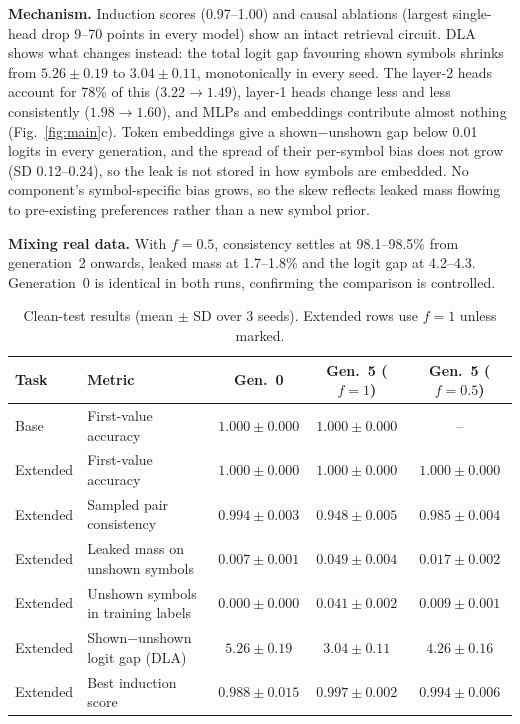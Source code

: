 \documentclass[10pt,a4paper]{article}
\begin{document}
\textbf{Mechanism.} Induction scores (0.97--1.00) and causal ablations (largest single-head drop 9--70 points in every model) show an intact retrieval circuit. DLA shows what changes instead: the total logit gap favouring shown symbols shrinks from $5.26\pm0.19$ to $3.04\pm0.11$, monotonically in every seed. The layer-2 heads account for 78\% of this ($3.22\to1.49$), layer-1 heads change less and less consistently ($1.98\to1.60$), and MLPs and embeddings contribute almost nothing (Fig.~\ref{fig:main}c). Token embeddings give a shown$-$unshown gap below 0.01 logits in every generation, and the spread of their per-symbol bias does not grow (SD 0.12--0.24), so the leak is not stored in how symbols are embedded. No component's symbol-specific bias grows, so the skew reflects leaked mass flowing to pre-existing preferences rather than a new symbol prior.

\textbf{Mixing real data.} With $f{=}0.5$, consistency settles at 98.1--98.5\% from generation~2 onwards, leaked mass at 1.7--1.8\% and the logit gap at 4.2--4.3. Generation~0 is identical in both runs, confirming the comparison is controlled.

\begin{table}[t]
\centering\small
\caption{Clean-test results (mean $\pm$ SD over 3 seeds). Extended rows use $f{=}1$ unless marked.}
\label{tab:res}
\begin{tabular}{llccc}
\toprule
Task & Metric & Gen.~0 & Gen.~5 ($f{=}1$) & Gen.~5 ($f{=}0.5$) \\
\midrule
Base & First-value accuracy & $1.000\pm0.000$ & $1.000\pm0.000$ & -- \\
Extended & First-value accuracy & $1.000\pm0.000$ & $1.000\pm0.000$ & $1.000\pm0.000$ \\
Extended & Sampled pair consistency & $0.994\pm0.003$ & $0.948\pm0.005$ & $0.985\pm0.004$ \\
Extended & Leaked mass on unshown symbols & $0.007\pm0.001$ & $0.049\pm0.004$ & $0.017\pm0.002$ \\
Extended & Unshown symbols in training labels & $0.000\pm0.000$ & $0.041\pm0.002$ & $0.009\pm0.001$ \\
Extended & Shown$-$unshown logit gap (DLA) & $5.26\pm0.19$ & $3.04\pm0.11$ & $4.26\pm0.16$ \\
Extended & Best induction score & $0.988\pm0.015$ & $0.997\pm0.002$ & $0.994\pm0.006$ \\
\bottomrule
\end{tabular}
\end{table}
\end{document}
